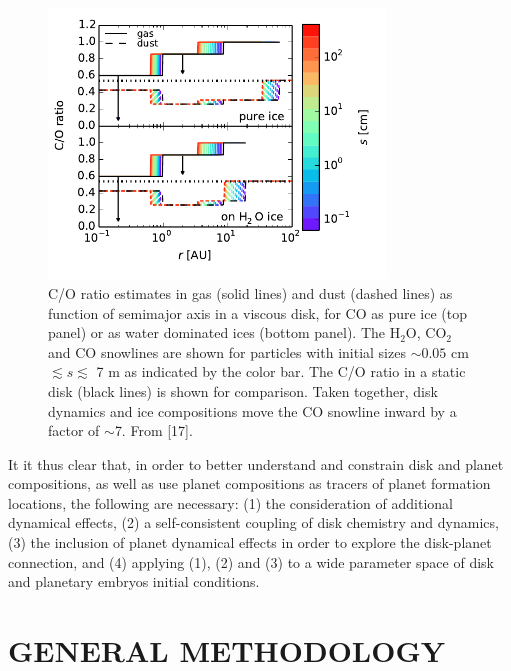 \documentclass[12pt, letterpaper]{article}
\begin{document}
\begin{figure}[h!]
\centering
\includegraphics[width=0.8\textwidth]{C_O_water_ice.pdf}
\caption{C/O ratio estimates in gas (solid lines) and dust (dashed lines) as function of semimajor axis in a viscous disk, for CO as pure ice (top panel) or as water dominated ices (bottom panel). The H$_2$O, CO$_2$ and CO snowlines are shown for particles with initial sizes $\sim0.05$ cm $\lesssim s \lesssim$ 7 m as indicated by the color bar. The C/O ratio in a static disk (black lines) is shown for comparison. Taken together, disk dynamics and ice compositions move the CO snowline inward by a factor of $\sim$7. From [17].} 
\label{fig:CO_ratio}
\end{figure}

It it thus clear that, in order to better understand and constrain disk and planet compositions, as well as use planet compositions as tracers of planet formation locations, the following are necessary: (1) the consideration of additional dynamical effects, (2) a self-consistent coupling of disk chemistry and dynamics, (3) the inclusion of planet dynamical effects in order to explore the disk-planet connection, and (4) applying (1), (2) and (3) to a wide parameter space of disk and planetary embryos initial conditions.   


\section{GENERAL METHODOLOGY}

\end{document}
